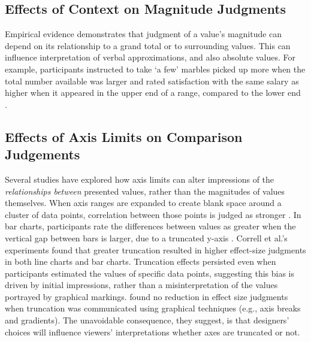 \documentclass[journal]{vgtc}                %
\begin{document}
\hypertarget{effects-of-context-on-magnitude-judgments}{%
\subsection{Effects of Context on Magnitude Judgments}\label{effects-of-context-on-magnitude-judgments}}

Empirical evidence demonstrates that judgment of a value's magnitude can
depend on its relationship to a grand total or to surrounding values.
This can influence interpretation of verbal approximations, and also
absolute values. For example, participants instructed to take `a few'
marbles picked up more when the total number available was larger
\citep{borges_common_1974} and rated satisfaction with the same salary as
higher when it appeared in the upper end of a range, compared to the
lower end \citep{brown_does_2008}.~

\hypertarget{effects-of-axis-limits-on-comparison-judgements}{%
\subsection{Effects of Axis Limits on Comparison Judgements}\label{effects-of-axis-limits-on-comparison-judgements}}

Several studies have explored how axis limits can alter impressions of
the \emph{relationships between} presented values, rather than the magnitudes
of values themselves. When axis ranges are expanded to create blank
space around a cluster of data points, correlation between those points
is judged as stronger \citep{cleveland_variables_1982}. In bar charts,
participants rate the differences between values as greater when the
vertical gap between bars is larger, due to a truncated y-axis
\citep{pandey_how_2015}. Correll et al.'s \citep{correll_truncating_2020}
experiments found that greater truncation resulted in higher effect-size
judgments in both line charts and bar charts. Truncation effects
persisted even when participants estimated the values of specific data
points, suggesting this bias is driven by initial impressions, rather
than a misinterpretation of the values portrayed by graphical markings.
\citet{correll_truncating_2020} found no reduction in effect size judgments
when truncation was communicated using graphical techniques (e.g., axis
breaks and gradients). The unavoidable consequence, they suggest, is
that designers' choices will influence viewers' interpretations whether
axes are truncated or not.
\end{document}
